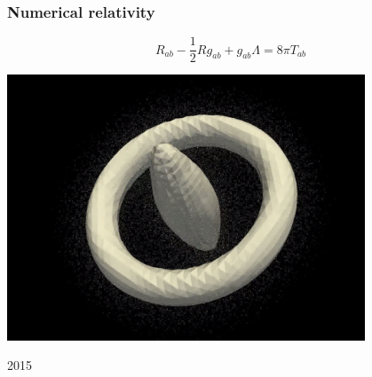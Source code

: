 \begin{frame}[fragile]
  \frametitle{Numerical relativity}

  \[ R_{ab} - \frac{1}{2} R g_{ab} + g_{ab} \Lambda = 8 \pi T_{ab} \]

  \begin{center}
    \includegraphics[width=0.8\textwidth]{png/einstein_vlasov.png}
  \end{center}


            {}
            {2015}

\end{frame}
